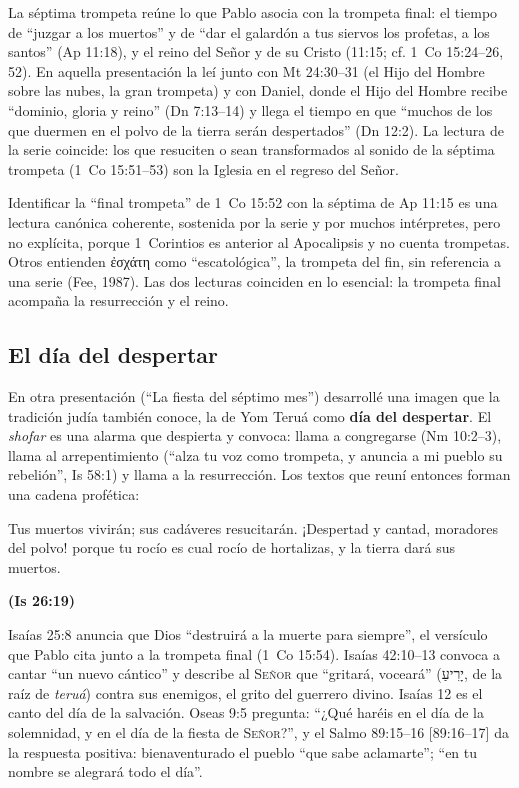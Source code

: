 \documentclass[11pt,letterpaper]{article}
\newcommand{\heb}[1]{\mbox{\foreignlanguage{hebrew}{#1}}}
\newcommand{\grc}[1]{\foreignlanguage{ancientgreek}{#1}}
\newcommand{\SENOR}{\textsc{Señor}}
\newcommand{\fuente}[1]{\par\hfill{\upshape\bfseries\small\textcolor{tierraroja}{#1}}}
\newcommand{\destacar}[1]{\textbf{\textcolor{tierraroja}{#1}}}
\begin{document}
La séptima trompeta reúne lo que Pablo asocia con la trompeta final: el tiempo de ``juzgar a los muertos'' y de ``dar el galardón a tus siervos los profetas, a los santos'' (Ap 11:18), y el reino del Señor y de su Cristo (11:15; cf. 1~Co 15:24--26, 52). En aquella presentación la leí junto con Mt 24:30--31 (el Hijo del Hombre sobre las nubes, la gran trompeta) y con Daniel, donde el Hijo del Hombre recibe ``dominio, gloria y reino'' (Dn 7:13--14) y llega el tiempo en que ``muchos de los que duermen en el polvo de la tierra serán despertados'' (Dn 12:2). La lectura de la serie coincide: los que resuciten o sean transformados al sonido de la séptima trompeta (1~Co 15:51--53) son la Iglesia en el regreso del Señor.

\begin{nota}
Identificar la ``final trompeta'' de 1~Co 15:52 con la séptima de Ap 11:15 es una lectura canónica coherente, sostenida por la serie y por muchos intérpretes, pero no explícita, porque 1~Corintios es anterior al Apocalipsis y no cuenta trompetas. Otros entienden \grc{ἐσχάτη} como ``escatológica'', la trompeta del fin, sin referencia a una serie (Fee, 1987). Las dos lecturas coinciden en lo esencial: la trompeta final acompaña la resurrección y el reino.
\end{nota}

\subsection{El día del despertar}
En otra presentación (``La fiesta del séptimo mes'') desarrollé una imagen que la tradición judía también conoce, la de Yom Teruá como \destacar{día del despertar}. El \emph{shofar} es una alarma que despierta y convoca: llama a congregarse (Nm 10:2--3), llama al arrepentimiento (``alza tu voz como trompeta, y anuncia a mi pueblo su rebelión'', Is 58:1) y llama a la resurrección. Los textos que reuní entonces forman una cadena profética:

\begin{cita}Tus muertos vivirán; sus cadáveres resucitarán. ¡Despertad y cantad, moradores del polvo! porque tu rocío es cual rocío de hortalizas, y la tierra dará sus muertos.\fuente{(Is 26:19)}\end{cita}

Isaías 25:8 anuncia que Dios ``destruirá a la muerte para siempre'', el versículo que Pablo cita junto a la trompeta final (1~Co 15:54). Isaías 42:10--13 convoca a cantar ``un nuevo cántico'' y describe al \SENOR{} que ``gritará, voceará'' (\heb{יָרִיעַ}, de la raíz de \emph{teruá}) contra sus enemigos, el grito del guerrero divino. Isaías 12 es el canto del día de la salvación. Oseas 9:5 pregunta: ``¿Qué haréis en el día de la solemnidad, y en el día de la fiesta de \SENOR?'', y el Salmo 89:15--16 [89:16--17] da la respuesta positiva: bienaventurado el pueblo ``que sabe aclamarte''; ``en tu nombre se alegrará todo el día''.
\end{document}
